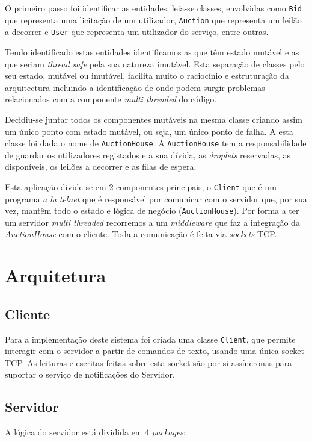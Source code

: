 \documentclass[a4paper]{article}
\begin{document}
O primeiro passo foi identificar as entidades, leia-se classes, envolvidas como \texttt{Bid} que representa uma licitação de um utilizador, \texttt{Auction} que representa um leilão a decorrer e \texttt{User} que representa um utilizador do serviço, entre outras.

Tendo identificado estas entidades identificamos as que têm estado mutável e as que seriam \textit{thread safe} pela sua natureza imutável. Esta separação de classes pelo seu estado, mutável ou imutável, facilita muito o raciocínio e estruturação da arquitectura incluindo a identificação de onde podem surgir problemas relacionados com a componente \textit{multi threaded} do código.

Decidiu-se juntar todos os componentes mutáveis na mesma classe criando assim um único ponto com estado mutável, ou seja, um único ponto de falha. A esta classe foi dada o nome de \texttt{AuctionHouse}. A \texttt{AuctionHouse} tem a responsabilidade de guardar os utilizadores registados e a sua dívida, as \textit{droplets} reservadas, as disponíveis, os leilões a decorrer e as filas de espera.

Esta aplicação divide-se em 2 componentes principais, o \texttt{Client} que é um programa \textit{a la} \textit{telnet} que é responsável por comunicar com o servidor que, por sua vez, mantêm todo o estado e lógica de negócio (\texttt{AuctionHouse}). Por forma a ter um servidor \textit{multi threaded} recorremos a um \textit{middleware} que faz a integração da \textit{AuctionHouse} com o cliente. Toda a comunicação é feita via \textit{sockets} TCP.

\section{Arquitetura}
\subsection{Cliente}
Para a implementação deste sistema foi criada uma classe \texttt{Client}, que permite interagir com o servidor a partir de comandos de texto, usando uma única socket TCP. As leituras e escritas feitas sobre esta socket são por si assíncronas para suportar o serviço de notificações do Servidor.

\subsection{Servidor}
A lógica do servidor está dividida em 4 \textit{packages}:
\end{document}
